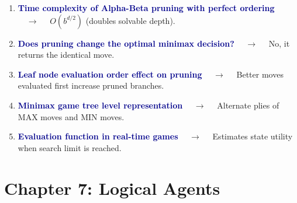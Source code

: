\documentclass[11pt,a4paper]{article}
\begin{document}
\begin{enumerate}[label=\arabic*., leftmargin=*, labelsep=0.8em, itemsep=0.35em, parsep=0.1em, topsep=0.2em]
  \item \textcolor{darkblue}{\textbf{Time complexity of Alpha-Beta pruning with perfect ordering}} $\quad\to\quad$ $O(b^{d/2})$ (doubles solvable depth).
  \item \textcolor{darkblue}{\textbf{Does pruning change the optimal minimax decision?}} $\quad\to\quad$ No, it returns the identical move.
  \item \textcolor{darkblue}{\textbf{Leaf node evaluation order effect on pruning}} $\quad\to\quad$ Better moves evaluated first increase pruned branches.
  \item \textcolor{darkblue}{\textbf{Minimax game tree level representation}} $\quad\to\quad$ Alternate plies of MAX moves and MIN moves.
  \item \textcolor{darkblue}{\textbf{Evaluation function in real-time games}} $\quad\to\quad$ Estimates state utility when search limit is reached.
\end{enumerate}

\section*{Chapter 7: Logical Agents}
\end{document}
